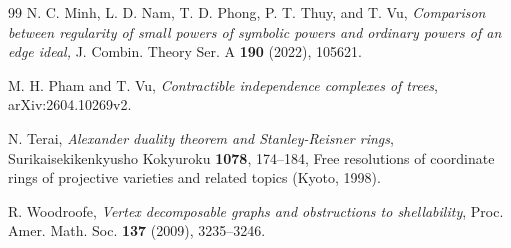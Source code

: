 \documentclass[12pt,amscd]{amsart}
\theoremstyle{definition}
\begin{document}
\begin{thebibliography}{99}
N. C. Minh, L. D. Nam, T. D. Phong, P. T. Thuy, and T. Vu,
{\em Comparison between regularity of small powers of symbolic powers and ordinary powers of an edge ideal,} J. Combin. Theory Ser. A {\bf 190} (2022), 105621.



 M. H. Pham and T. Vu, {\it Contractible independence complexes of trees}, arXiv:2604.10269v2.



 N. Terai, {\it Alexander duality theorem and Stanley-Reisner rings},
Surikaisekikenkyusho Kokyuroku {\bf 1078}, 174--184, Free resolutions of
coordinate rings of projective varieties and related topics (Kyoto, 1998).


 R. Woodroofe, {\it Vertex decomposable graphs and obstructions to shellability}, Proc. Amer. Math. Soc. {\bf 137} (2009), 3235--3246.



\end{thebibliography}
\end{document}
